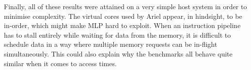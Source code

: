 Finally, all of these results were attained on a very simple host system in order to minimise complexity. The virtual cores used by Ariel appear, in hindsight, to be in-order, which might make MLP hard to exploit. When an instruction pipeline has to stall entirely while waiting for data from the memory, it is difficult to schedule data in a way where multiple memory requests can be in-flight simultaneously. This could also explain why the benchmarks all behave quite similar when it comes to access times.
